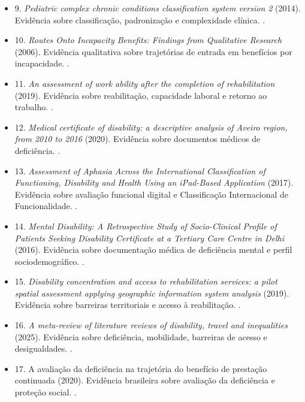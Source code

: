 \documentclass[12pt,a4paper]{article}
\begin{document}
\begin{itemize}
\item 9. \textit{Pediatric complex chronic conditions classification system version 2} (2014). Evidência sobre classificação, padronização e complexidade clínica. \parencite{feudtner2014pediatriccomplexchronicconditionsclassificationsyst}.
\item 10. \textit{Routes Onto Incapacity Benefits: Findings from Qualitative Research} (2006). Evidência qualitativa sobre trajetórias de entrada em benefícios por incapacidade. \parencite{sainsbury2006routesontoincapacitybenefitsfindingsfromqualitati}.
\item 11. \textit{An assessment of work ability after the completion of rehabilitation} (2019). Evidência sobre reabilitação, capacidade laboral e retorno ao trabalho. \parencite{przysada2019anassessmentofworkabilityafterthecompletionofre}.
\item 12. \textit{Medical certificate of disability: a descriptive analysis of Aveiro region, from 2010 to 2016} (2020). Evidência sobre documentos médicos de deficiência. \parencite{sa2020medicalcertificateofdisabilityadescriptiveanalysisofav}.
\item 13. \textit{Assessment of Aphasia Across the International Classification of Functioning, Disability and Health Using an iPad-Based Application} (2017). Evidência sobre avaliação funcional digital e Classificação Internacional de Funcionalidade. \parencite{guo2017assessmentofaphasiaacrosstheinternationalclassification}.
\item 14. \textit{Mental Disability: A Retrospective Study of Socio-Clinical Profile of Patients Seeking Disability Certificate at a Tertiary Care Centre in Delhi} (2016). Evidência sobre documentação médica de deficiência mental e perfil sociodemográfico. \parencite{hospital2016mentaldisabilityaretrospectivestudyofsocioclinica}.
\item 15. \textit{Disability concentration and access to rehabilitation services: a pilot spatial assessment applying geographic information system analysis} (2019). Evidência sobre barreiras territoriais e acesso à reabilitação. \parencite{gao2019disabilityconcentrationandaccesstorehabilitationservice}.
\item 16. \textit{A meta-review of literature reviews of disability, travel and inequalities} (2025). Evidência sobre deficiência, mobilidade, barreiras de acesso e desigualdades. \parencite{mackett2025ametareviewofliteraturereviewsofdisabilitytravel}.
\item 17. A avaliação da deficiência na trajetória do benefício de prestação continuada (2020). Evidência brasileira sobre avaliação da deficiência e proteção social. \parencite{nogueira20200731t0100000100aavaliacaodadeficiencianatraje}.

\end{itemize}
\end{document}
